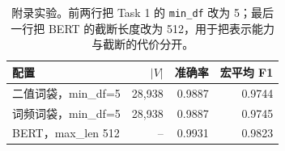 \begin{table}[h]
\centering
\footnotesize
\caption{附录实验。前两行把 Task 1 的 \texttt{min\_df} 改为 5；最后一行把 BERT 的截断长度改为 512，用于把表示能力与截断的代价分开。}
\label{tab:appendix}
\begin{tabular}{lrrr}
\toprule
配置 & $\lvert V \rvert$ & 准确率 & 宏平均 F1 \\
\midrule
二值词袋，min\_df=5 & 28,938 & 0.9887 & 0.9744 \\
词频词袋，min\_df=5 & 28,938 & 0.9887 & 0.9745 \\
BERT，max\_len 512 & -- & 0.9931 & 0.9823 \\
\bottomrule
\end{tabular}
\end{table}
